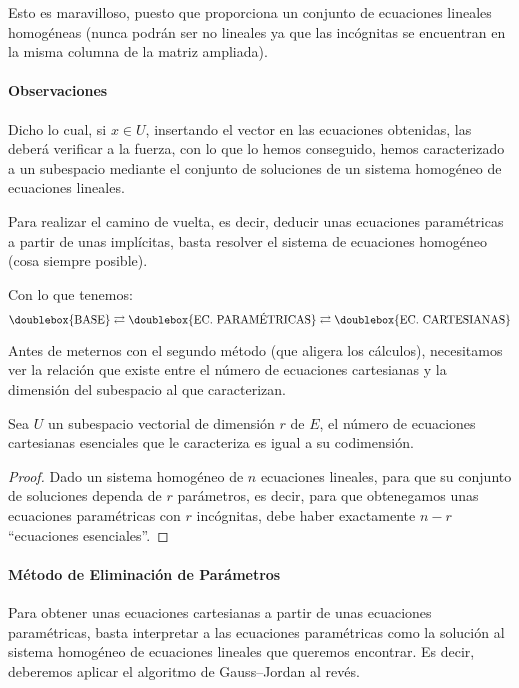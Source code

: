 Esto es maravilloso, puesto que proporciona un conjunto de ecuaciones lineales homogéneas (nunca podrán ser no lineales ya que las incógnitas se encuentran en la misma columna de la matriz ampliada).

\paragraph{Observaciones}
Dicho lo cual, si $x\in U$, insertando el vector en las ecuaciones obtenidas, las deberá verificar a la fuerza, con lo que lo hemos conseguido, hemos caracterizado a un subespacio mediante el conjunto de soluciones de un sistema homogéneo de ecuaciones lineales.

Para realizar el camino de vuelta, es decir, deducir unas ecuaciones paramétricas a partir de unas implícitas, basta resolver el sistema de ecuaciones homogéneo (cosa siempre posible).

Con lo que tenemos:
\begin{equation*}
	\doublebox{\textrm{BASE}}\rightleftarrows\doublebox{\textrm{EC. PARAMÉTRICAS}}\rightleftarrows\doublebox{\textrm{EC. CARTESIANAS}}
\end{equation*}

Antes de meternos con el segundo método (que aligera los cálculos), necesitamos ver la relación que existe entre el número de ecuaciones cartesianas y la dimensión del subespacio al que caracterizan.

\begin{prop}
	Sea $U$ un subespacio vectorial de dimensión $r$ de $E$, el número de ecuaciones cartesianas esenciales que le caracteriza es igual a su codimensión.
\end{prop}
\begin{proof}
	Dado un sistema homogéneo de $n$ ecuaciones lineales, para que su conjunto de soluciones dependa de $r$ parámetros, es decir, para que obtenegamos unas ecuaciones paramétricas con $r$ incógnitas, debe haber exactamente $n-r$ ``ecuaciones esenciales''.
\end{proof}
\paragraph{Método de Eliminación de Parámetros} Para obtener unas ecuaciones cartesianas a partir de unas ecuaciones paramétricas, basta interpretar a las ecuaciones paramétricas como la solución al sistema homogéneo de ecuaciones lineales que queremos encontrar. Es decir, deberemos aplicar el algoritmo de Gauss--Jordan al revés.